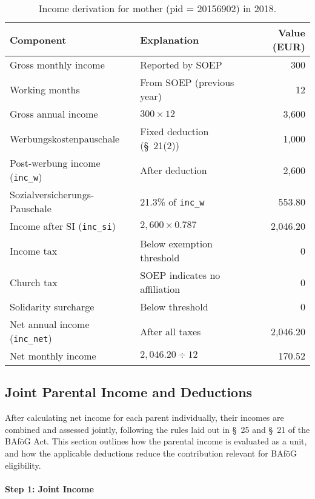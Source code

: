 \begin{table}[H]
\scriptsize
\centering
\begin{tabular}{llr}
\toprule
\textbf{Component} & \textbf{Explanation} & \textbf{Value (EUR)} \\
\midrule
Gross monthly income & Reported by SOEP & 300 \\
Working months & From SOEP (previous year) & 12 \\
Gross annual income & $300 \times 12$ & 3,600 \\
Werbungskostenpauschale & Fixed deduction (§~21(2)) & 1,000 \\
Post-werbung income (\texttt{inc\_w}) & After deduction & 2,600 \\
Sozialversicherungs-Pauschale & 21.3\% of \texttt{inc\_w} & 553.80 \\
Income after SI (\texttt{inc\_si}) & $2{,}600 \times 0.787$ & 2,046.20 \\
Income tax & Below exemption threshold & 0 \\
Church tax & SOEP indicates no affiliation & 0 \\
Solidarity surcharge & Below threshold & 0 \\
Net annual income (\texttt{inc\_net}) & After all taxes & 2,046.20 \\
Net monthly income & $2{,}046.20 \div 12$ & 170.52 \\
\bottomrule
\end{tabular}
\caption{Income derivation for mother (pid = 20156902) in 2018.}
\label{table:bafoeg_parent_mother}
\end{table}


\subsection{Joint Parental Income and Deductions}

After calculating net income for each parent individually, their incomes are combined and assessed jointly, following the rules laid out in §~25 and §~21 of the BAföG Act. This section outlines how the parental income is evaluated as a unit, and how the applicable deductions reduce the contribution relevant for BAföG eligibility.

\paragraph{Step 1: Joint Income}

